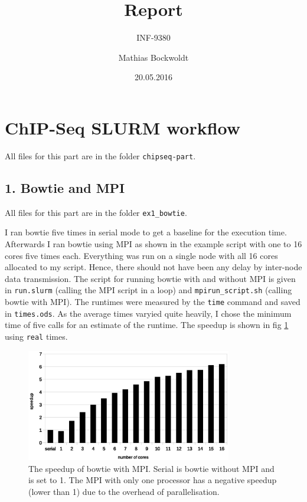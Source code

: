 \documentclass[paper=a4, 12pt]{scrartcl}
\begin{document}
\title{Report}
\subtitle{INF-9380}
\author{Mathias Bockwoldt}
\date{20.05.2016}

\maketitle

\onehalfspacing

\section{ChIP-Seq SLURM workflow}

All files for this part are in the folder \texttt{chipseq-part}.

\subsection{1. Bowtie and MPI}

All files for this part are in the folder \texttt{ex1\_bowtie}.

I ran bowtie five times in serial mode to get a baseline for the execution time. Afterwards I ran bowtie using MPI as shown in the example script with one to 16 cores five times each. Everything was run on a single node with all 16 cores allocated to my script. Hence, there should not have been any delay by inter-node data transmission. The script for running bowtie with and without MPI is given in \texttt{run.slurm} (calling the MPI script in a loop) and \texttt{mpirun\_script.sh} (calling bowtie with MPI). The runtimes were measured by the \texttt{time} command and saved in \texttt{times.ods}. As the average times varyied quite heavily, I chose the minimum time of five calls for an estimate of the runtime. The speedup is shown in fig \ref{fig:chipseq-bowtie} using \texttt{real} times.

\begin{figure}[ht]
	\centering
		\includegraphics[width=0.8\textwidth]{chipseq-bowtie}
	\caption{The speedup of bowtie with MPI. Serial is bowtie without MPI and is set to 1. The MPI with only one processor has a negative speedup (lower than 1) due to the overhead of parallelisation.}
	\label{fig:chipseq-bowtie}
\end{figure}
\end{document}

